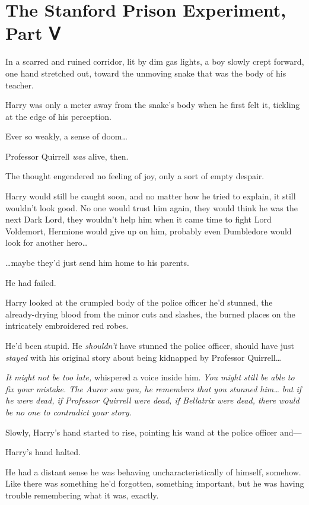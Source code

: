 \chapter{The Stanford Prison Experiment, Part
Ⅴ}\label{the-stanford-prison-experiment-part}

In a scarred and ruined corridor, lit by dim gas lights, a boy slowly
crept forward, one hand stretched out, toward the unmoving snake that
was the body of his teacher.

Harry was only a meter away from the snake's body when he first felt it,
tickling at the edge of his perception.

Ever so weakly, a sense of doom\ldots{}

Professor Quirrell \emph{was} alive, then.

The thought engendered no feeling of joy, only a sort of empty despair.

Harry would still be caught soon, and no matter how he tried to explain,
it still wouldn't look good. No one would trust him again, they would
think he was the next Dark Lord, they wouldn't help him when it came
time to fight Lord Voldemort, Hermione would give up on him, probably
even Dumbledore would look for another hero\ldots{}

\ldots{}maybe they'd just send him home to his parents.

He had failed.

Harry looked at the crumpled body of the police officer he'd stunned,
the already-drying blood from the minor cuts and slashes, the burned
places on the intricately embroidered red robes.

He'd been stupid. He \emph{shouldn't} have stunned the police officer,
should have just \emph{stayed} with his original story about being
kidnapped by Professor Quirrell\ldots{}

\emph{It might not be too late,} whispered a voice inside him. \emph{You
might still be able to fix your mistake. The Auror saw you, he remembers
that you stunned him\ldots{} but if he were dead, if Professor Quirrell
were dead, if Bellatrix were dead, there would be no one to contradict
your story.}

Slowly, Harry's hand started to rise, pointing his wand at the police
officer and---

Harry's hand halted.

He had a distant sense he was behaving uncharacteristically of himself,
somehow. Like there was something he'd forgotten, something important,
but he was having trouble remembering what it was, exactly.

